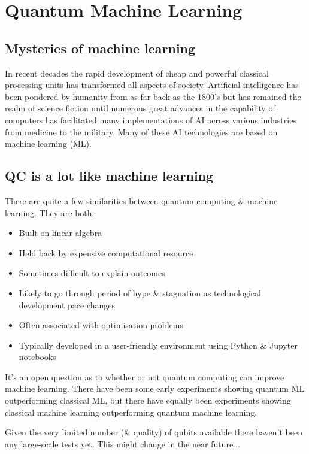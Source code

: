 \chapter{Quantum Machine Learning}

\section{Mysteries of machine learning}


In recent decades the rapid development of cheap and powerful classical processing units has transformed all aspects of society. Artificial intelligence has been pondered by humanity from as far back as the 1800's but has remained the realm of science fiction until numerous great advances in the capability of computers has facilitated many implementations of AI across various industries from medicine to the military. Many of these AI technologies are based on machine learning (ML). 

\section{QC is a lot like machine learning}

There are quite a few similarities between quantum computing \& machine learning. They are both:

\begin{itemize}
    \item Built on linear algebra
    \item Held back by expensive computational resource
    \item Sometimes difficult to explain outcomes 
    \item Likely to go through period of hype \& stagnation as technological development pace changes
    \item Often associated with optimisation problems 
    \item Typically developed in a user-friendly environment using Python \& Jupyter notebooks 
\end{itemize}


It's an open question as to whether or not quantum computing can improve machine learning. There have been some early experiments showing quantum ML outperforming classical ML, but there have equally been experiments showing classical machine learning outperforming quantum machine learning. 

 Given the very limited number (\& quality) of qubits available there haven't been any large-scale tests yet. This might change in the near future...

